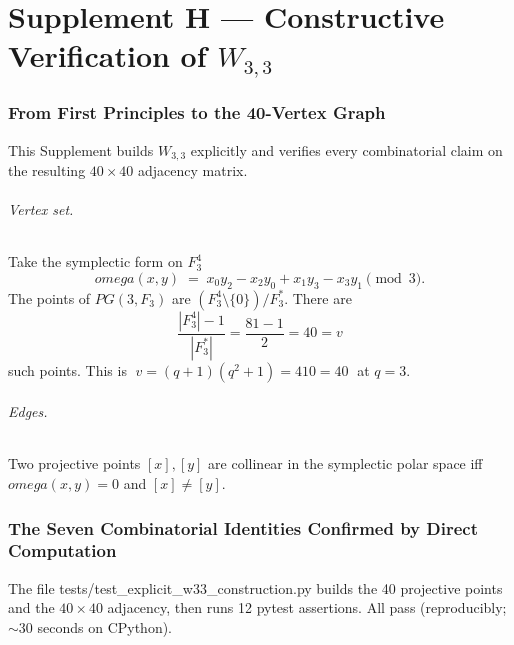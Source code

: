\documentclass[12pt,a4paper]{article}
\def\mathbb#1{#1}%
\def\mathrm#1{#1}%
\def\texttt#1{#1}%
\def\omega{omega}%
\def\cdot{ }%
\theoremstyle{definition}
\newcommand{\PG}{\mathrm{PG}}
\newcommand{\FF}{\mathbb{F}}
\begin{document}
\part*{Supplement H --- Constructive Verification of $W_{3,3}$}

\section*{From First Principles to the 40-Vertex Graph}

This Supplement builds $W_{3,3}$ explicitly and verifies every
combinatorial claim on the resulting $40\times 40$ adjacency matrix.

\paragraph{Vertex set.}
Take the symplectic form on $\FF_3^4$
\[
\omega(x,y) \;=\; x_0 y_2 - x_2 y_0 + x_1 y_3 - x_3 y_1 \pmod 3.
\]
The points of $\PG(3,\FF_3)$ are $(\FF_3^4\setminus\{0\})/\FF_3^{\ast}$.
There are
\[
\frac{|\FF_3^4|-1}{|\FF_3^{\ast}|} = \frac{81-1}{2} = 40 = v
\]
such points. This is $\boxed{\;v=(q+1)(q^2+1)=4\cdot 10=40\;}$ at $q=3$.

\paragraph{Edges.}
Two projective points $[x], [y]$ are collinear in the symplectic polar
space iff $\omega(x,y)=0$ and $[x]\ne[y]$.

\section*{The Seven Combinatorial Identities Confirmed by Direct Computation}

The file \texttt{tests/test\_explicit\_w33\_construction.py} builds the
40 projective points and the $40\times 40$ adjacency, then runs 12
pytest assertions. All pass (reproducibly; $\sim$30 seconds on CPython).
\end{document}
